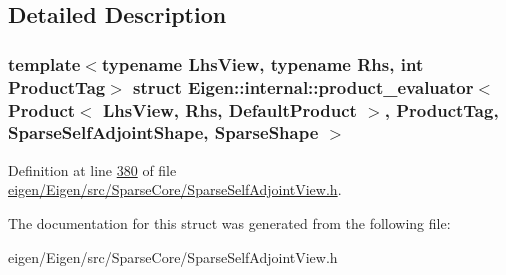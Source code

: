 \subsection{Detailed Description}
\subsubsection*{template$<$typename Lhs\+View, typename Rhs, int Product\+Tag$>$\newline
struct Eigen\+::internal\+::product\+\_\+evaluator$<$ Product$<$ Lhs\+View, Rhs, Default\+Product $>$, Product\+Tag, Sparse\+Self\+Adjoint\+Shape, Sparse\+Shape $>$}



Definition at line \hyperlink{eigen_2_eigen_2src_2_sparse_core_2_sparse_self_adjoint_view_8h_source_l00380}{380} of file \hyperlink{eigen_2_eigen_2src_2_sparse_core_2_sparse_self_adjoint_view_8h_source}{eigen/\+Eigen/src/\+Sparse\+Core/\+Sparse\+Self\+Adjoint\+View.\+h}.



The documentation for this struct was generated from the following file\+:\begin{DoxyCompactItemize}
\item 
eigen/\+Eigen/src/\+Sparse\+Core/\+Sparse\+Self\+Adjoint\+View.\+h\end{DoxyCompactItemize}
